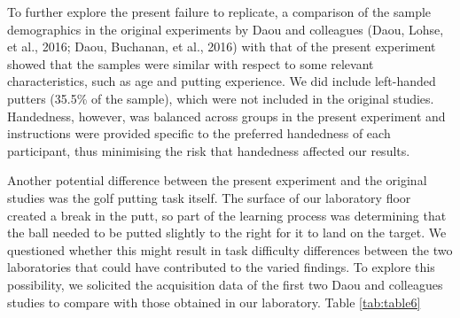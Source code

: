 \documentclass[
  english,
  man,floatsintext]{apa7}
\begin{document}
To further explore the present failure to replicate, a comparison of the sample demographics in the original experiments by Daou and colleagues (Daou, Lohse, et al., 2016; Daou, Buchanan, et al., 2016) with that of the present experiment showed that the samples were similar with respect to some relevant characteristics, such as age and putting experience. We did include left-handed putters (35.5\% of the sample), which were not included in the original studies. Handedness, however, was balanced across groups in the present experiment and instructions were provided specific to the preferred handedness of each participant, thus minimising the risk that handedness affected our results.

Another potential difference between the present experiment and the original studies was the golf putting task itself. The surface of our laboratory floor created a break in the putt, so part of the learning process was determining that the ball needed to be putted slightly to the right for it to land on the target. We questioned whether this might result in task difficulty differences between the two laboratories that could have contributed to the varied findings. To explore this possibility, we solicited the acquisition data of the first two Daou and colleagues studies to compare with those obtained in our laboratory. Table \ref{tab:table6}
\end{document}
